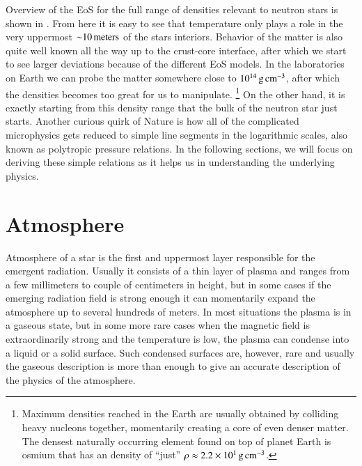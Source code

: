 Overview of the EoS for the full range of densities relevant to neutron stars is shown in .
From here it is easy to see that temperature only plays a role in the very uppermost $\mathord{\sim} 10\,\mathrm{meters}$ of the stars interiors.
Behavior of the matter is also quite well known all the way up to the crust-core interface, after which we start to see larger deviations because of the different EoS models.
In the laboratories on Earth we can probe the matter somewhere close to $10^{14} \, \mathrm{g}\,\mathrm{cm}^{-3}$, after which the densities becomes too great for us to manipulate.%
\footnote{Maximum densities reached in the Earth are usually obtained by colliding heavy nucleons together, momentarily creating a core of even denser matter.
The densest naturally occurring element found on top of planet Earth is osmium that has an  density of ``just'' $\rho \approx 2.2 \times 10^{1}\, \mathrm{g}\,\mathrm{cm}^{-3}$.
}
On the other hand, it is exactly starting from this density range that the bulk of the neutron star just starts.
Another curious quirk of Nature is how all of the complicated microphysics gets reduced to simple line segments in the logarithmic scales, also known as polytropic pressure relations.
In the following sections, we will focus on deriving these simple relations as it helps us in understanding the underlying physics.

\section{Atmosphere}\label{sect:atmos}

Atmosphere of a star is the first and uppermost layer responsible for the emergent radiation.
Usually it consists of a thin layer of plasma and ranges from a few millimeters to couple of centimeters in height, but in some cases if the emerging radiation field is strong enough it can momentarily expand the atmosphere up to several hundreds of meters.
In most situations the plasma is in a gaseous state, but in some more rare cases when the magnetic field is extraordinarily strong and the temperature is low, the plasma can condense into a liquid or a solid surface.
Such condensed surfaces are, however, rare and usually the gaseous description is more than enough to give an accurate description of the physics of the atmosphere.\cite[see e.g.,][for a review]{ZP02, Potekhin14}

